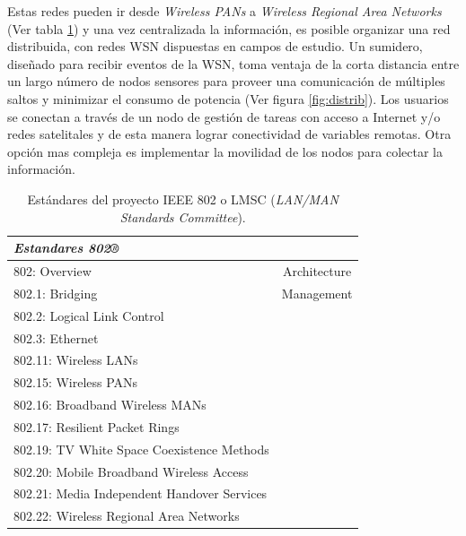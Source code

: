 Estas redes pueden ir desde \textit{Wireless PANs} a \textit{Wireless Regional Area Networks} (Ver tabla \ref{tab:802}) y una vez centralizada la información, es posible organizar una red distribuida, con redes WSN dispuestas en campos de estudio. Un sumidero, diseñado para recibir eventos de la WSN, toma ventaja de la corta distancia entre un largo número de nodos sensores para proveer una comunicación de múltiples saltos y minimizar el consumo de potencia (Ver figura \ref{fig:distrib}). Los usuarios se conectan a través de un nodo de gestión de tareas con acceso a Internet y/o redes satelitales y de esta manera lograr conectividad de variables remotas. Otra opción mas compleja es implementar la movilidad de los nodos para colectar la información.




\begin{table}[ht]
	\centering
	\caption{Estándares del proyecto IEEE 802 o LMSC (\textit{LAN/MAN Standards Committee}).}
	\begin{tabular}{@{} l *1c @{}}    \toprule
		\emph{\textbf{Estandares 802®}} \\
		\midrule
        802: Overview & Architecture\\
        802.1: Bridging & Management\\
        802.2: Logical Link Control\\
        802.3: Ethernet\\
        802.11: Wireless LANs\\
        802.15: Wireless PANs\\
        802.16: Broadband Wireless MANs\\
        802.17: Resilient Packet Rings\\
        802.19: TV White Space Coexistence Methods\\
        802.20: Mobile Broadband Wireless Access\\
        802.21: Media Independent Handover Services\\
        802.22: Wireless Regional Area Networks\\
		\bottomrule
		\hline
	\end{tabular}
	\label{tab:802}
\end{table}

